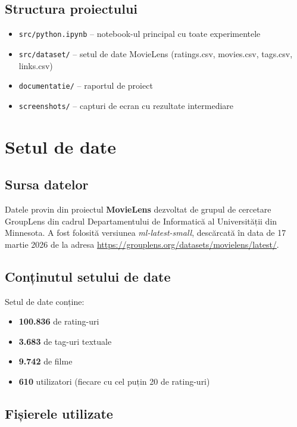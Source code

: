 \documentclass[12pt,a4paper]{article}
\begin{document}
\subsection{Structura proiectului}

\begin{itemize}[noitemsep]
    \item \texttt{src/python.ipynb} -- notebook-ul principal cu toate experimentele
    \item \texttt{src/dataset/} -- setul de date MovieLens (ratings.csv, movies.csv, tags.csv, links.csv)
    \item \texttt{documentatie/} -- raportul de proiect
    \item \texttt{screenshots/} -- capturi de ecran cu rezultate intermediare
\end{itemize}

\section{Setul de date}

\subsection{Sursa datelor}

Datele provin din proiectul \textbf{MovieLens} dezvoltat de grupul de cercetare GroupLens din cadrul Departamentului de Informatică al Universității din Minnesota. A fost folosită versiunea \textit{ml-latest-small}, descărcată în data de 17 martie 2026 de la adresa \url{https://grouplens.org/datasets/movielens/latest/}.

\subsection{Conținutul setului de date}

Setul de date conține:
\begin{itemize}[noitemsep]
    \item \textbf{100.836} de rating-uri
    \item \textbf{3.683} de tag-uri textuale
    \item \textbf{9.742} de filme
    \item \textbf{610} utilizatori (fiecare cu cel puțin 20 de rating-uri)
\end{itemize}

\subsection{Fișierele utilizate}
\end{document}
